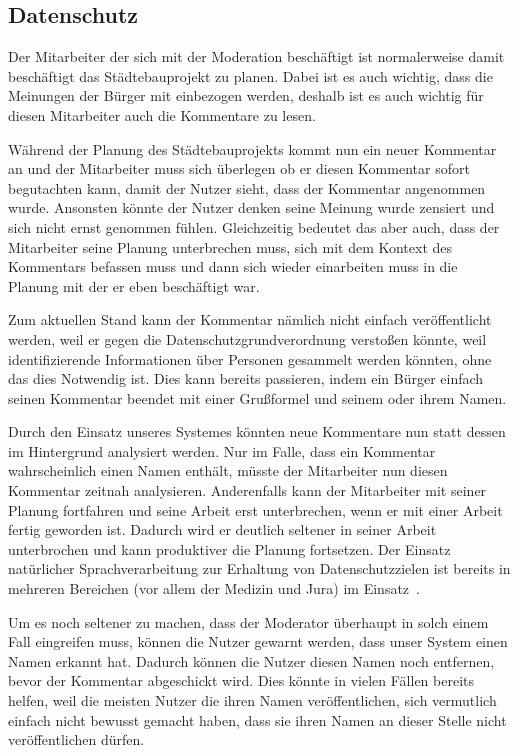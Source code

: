\documentclass[runningheads]{llncs}
\begin{document}
	\subsection{Datenschutz}
		Der Mitarbeiter der sich mit der Moderation beschäftigt ist normalerweise damit beschäftigt das Städtebauprojekt zu planen.
		Dabei ist es auch wichtig, dass die Meinungen der Bürger mit einbezogen werden, deshalb ist es auch wichtig für diesen Mitarbeiter auch die Kommentare zu lesen.
		
		Während der Planung des Städtebauprojekts kommt nun ein neuer Kommentar an und der Mitarbeiter muss sich überlegen ob er diesen Kommentar sofort begutachten kann, damit der Nutzer sieht, dass der Kommentar angenommen wurde.
		Ansonsten könnte der Nutzer denken seine Meinung wurde zensiert und sich nicht ernst genommen fühlen.
		Gleichzeitig bedeutet das aber auch, dass der Mitarbeiter seine Planung unterbrechen muss, sich mit dem Kontext des Kommentars befassen muss und dann sich wieder einarbeiten muss in die Planung mit der er eben beschäftigt war.
		
		Zum aktuellen Stand kann der Kommentar nämlich nicht einfach veröffentlicht werden, weil er gegen die Datenschutzgrundverordnung verstoßen könnte, weil identifizierende Informationen über Personen gesammelt werden könnten, ohne das dies Notwendig ist. 
		Dies kann bereits passieren, indem ein Bürger einfach seinen Kommentar beendet mit einer Grußformel und seinem oder ihrem Namen.
		
		Durch den Einsatz unseres Systemes könnten neue Kommentare nun statt dessen im Hintergrund analysiert werden.
		Nur im Falle, dass ein Kommentar wahrscheinlich einen Namen enthält, müsste der Mitarbeiter nun diesen Kommentar zeitnah analysieren.
		Anderenfalls kann der Mitarbeiter mit seiner Planung fortfahren und seine Arbeit erst unterbrechen, wenn er mit einer Arbeit fertig geworden ist.
		Dadurch wird er deutlich seltener in seiner Arbeit unterbrochen und kann produktiver die Planung fortsetzen.
		Der Einsatz natürlicher Sprachverarbeitung zur Erhaltung von Datenschutzzielen ist bereits in mehreren Bereichen (vor allem der Medizin und Jura) im Einsatz~\cite{sadat2019privacy}.
		
		Um es noch seltener zu machen, dass der Moderator überhaupt in solch einem Fall eingreifen muss, können die Nutzer gewarnt werden, dass unser System einen Namen erkannt hat.
		Dadurch können die Nutzer diesen Namen noch entfernen, bevor der Kommentar abgeschickt wird.
		Dies könnte in vielen Fällen bereits helfen, weil die meisten Nutzer die ihren Namen veröffentlichen, sich vermutlich einfach nicht bewusst gemacht haben, dass sie ihren Namen an dieser Stelle nicht veröffentlichen dürfen.
		
\end{document}

